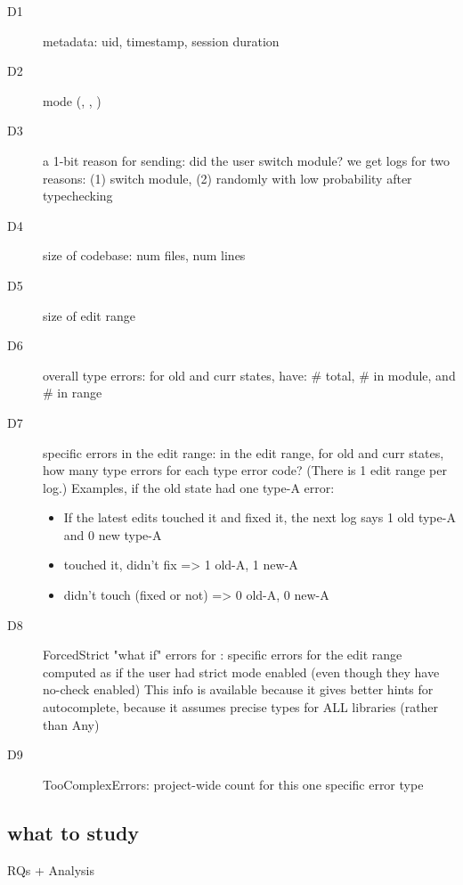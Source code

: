 \documentclass[english,submission,cleveref]{programming}
\begin{document}
\begin{description}
  \item[D1] metadata: uid, timestamp, session duration
  \item[D2] mode (\mnocheck{}, \mnonstrict{}, \mstrict{})
  \item[D3] a 1-bit reason for sending: did the user switch module?
    \subitem we get logs for two reasons: (1) switch module, (2) randomly with
    low probability after typechecking
  \item[D4] size of codebase: num files, num lines
  \item[D5] size of edit range
  \item[D6] overall type errors: for old and curr states, have: \# total, \# in module, and \# in range
  \item[D7] specific errors in the edit range: in the edit range, for old and
    curr states, how many type errors for each type error code? (There is 1
    edit range per log.)
    \subitem Examples, if the old state had one type-A error:
    \begin{itemize}
      \item If the latest edits touched it and fixed it, the next log says 1
        old type-A and 0 new type-A
      \item touched it, didn't fix => 1 old-A, 1 new-A
      \item didn't touch (fixed or not) => 0 old-A, 0 new-A
    \end{itemize}
  \item[D8] ForcedStrict "what if" errors for \mnocheck{}: specific errors for the
    edit range computed as if the user had strict mode enabled (even though they
    have no-check enabled)
    \subitem This info is available because it gives better hints for
    autocomplete, because it assumes precise types for ALL libraries (rather
    than Any)
  \item[D9] TooComplexErrors: project-wide count for this one specific error type
\end{description}


\subsection{what to study}

RQs + Analysis
\end{document}
